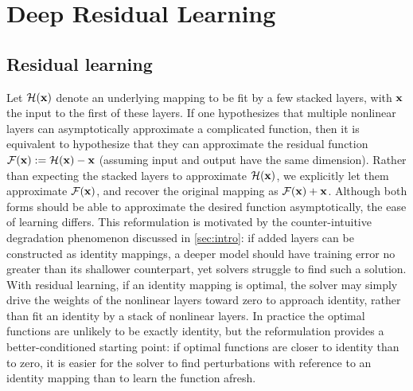 \section{Deep Residual Learning}
\label{sec:method}

\subsection{Residual learning}
\label{sec:method:residual}
Let $\mathcal{H}(\mathbf{x})$ denote an underlying mapping to be fit by a few stacked layers, with
$\mathbf{x}$ the input to the first of these layers. If one hypothesizes that multiple
nonlinear layers can asymptotically approximate a complicated function, then it is
equivalent to hypothesize that they can approximate the residual function
$\mathcal{F}(\mathbf{x}) := \mathcal{H}(\mathbf{x}) - \mathbf{x}$ (assuming input and output have the same
dimension). Rather than expecting the stacked layers to approximate $\mathcal{H}(\mathbf{x})$, we
explicitly let them approximate $\mathcal{F}(\mathbf{x})$, and recover the original mapping as
$\mathcal{F}(\mathbf{x}) + \mathbf{x}$. Although both forms should be able to approximate the desired
function asymptotically, the ease of learning differs. This reformulation is motivated
by the counter-intuitive degradation phenomenon discussed in \cref{sec:intro}: if added
layers can be constructed as identity mappings, a deeper model should have training
error no greater than its shallower counterpart, yet solvers struggle to find such a
solution. With residual learning, if an identity mapping is optimal, the solver may
simply drive the weights of the nonlinear layers toward zero to approach identity,
rather than fit an identity by a stack of nonlinear layers. In practice the optimal
functions are unlikely to be exactly identity, but the reformulation provides a
better-conditioned starting point: if optimal functions are closer to identity than to
zero, it is easier for the solver to find perturbations with reference to an identity
mapping than to learn the function afresh.

